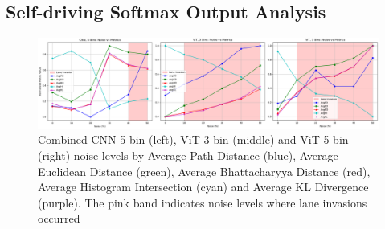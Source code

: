 \subsection{Self-driving Softmax Output Analysis}








\begin{figure}[H]
    \centering
    \includegraphics[width=1.0\linewidth]{Figures/Results/combined_cnn_5bin_vit_3bin_vit_5bin_noise_distance_metrics.png}
    \caption{Combined CNN 5 bin (left), ViT 3 bin (middle) and ViT 5 bin (right) noise levels by Average Path Distance (blue), Average Euclidean Distance (green), Average Bhattacharyya Distance (red), Average Histogram Intersection (cyan) and Average KL Divergence (purple). The pink band indicates noise levels where lane invasions occurred}
    \label{fig:combined_cnn_5bin_vit_3bin_vit_5bin_noise_distance_metrics}
\end{figure}

